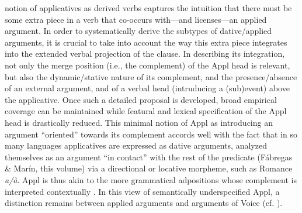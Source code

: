 \documentclass[output=paper,modfonts,nonflat]{langsci/langscibook}
\begin{document}
 notion of applicatives as derived verbs captures the intuition that there must be some extra piece in a verb that co-occurs with—and licenses—an applied argument. In order to systematically derive the subtypes of dative/applied arguments, it is crucial to take into account the way this extra piece integrates into the extended verbal projection of the clause. In describing its integration, not only the merge position (i.e., the complement) of the Appl head is relevant, but also the dynamic/stative nature of its complement, and the presence/absence of an external argument, and of a verbal head (intruducing a (sub)event) above the applicative. Once such a detailed proposal is developed, broad empirical coverage can be maintained while featural and lexical specification of the Appl head is drastically reduced. This minimal notion of Appl as introducing an argument “oriented” towards its complement accords well with the fact that in so many languages applicatives are expressed as dative arguments, analyzed themselves as an argument “in contact” with the rest of the predicate (Fábregas \& Marín, this volume) via a directional or locative morpheme, such as Romance \textit{a/à}. Appl is thus akin to the more grammatical adpositions whose complement is interpreted contextually \citep{Svenonious2007}. In this view of semantically underspecified Appl, a distinction remains between applied arguments and arguments of Voice (cf. \citealt{WoodMarantz2017}). 
\end{document}
